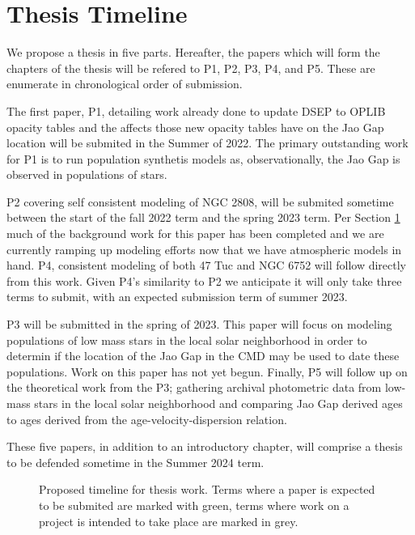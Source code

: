 \section{Thesis Timeline}
We propose a thesis in five parts. Hereafter, the papers which will form the
chapters of the thesis will be refered to P1, P2, P3, P4, and P5. These are
enumerate in chronological order of submission.

The first paper, P1, detailing work already done to update DSEP to OPLIB opacity
tables and the affects those new opacity tables have on the Jao Gap location
will be submited in the Summer of 2022. The primary outstanding work for P1 
is to run population synthetis models as, observationally, the Jao Gap is
observed in populations of stars.

P2 covering self consistent modeling of NGC 2808, will be submited sometime
between the start of the fall 2022 term and the spring 2023 term. Per Section
\ref{} much of the background work for this paper has been completed and we are
currently ramping up modeling efforts now that we have atmospheric models in
hand. P4, consistent modeling of both 47 Tuc and NGC 6752 will follow directly
from this work. Given P4's similarity to P2 we anticipate it will only take
three terms to submit, with an expected submission term of summer 2023.

P3 will be submitted in the spring of 2023. This paper will focus on modeling
populations of low mass stars in the local solar neighborhood in order to
determin if the location of the Jao Gap in the CMD may be used to date these
populations. Work on this paper has not yet begun. Finally, P5 will follow up
on the theoretical work from the P3; gathering archival photometric data from
low-mass stars in the local solar neighborhood and comparing Jao Gap derived
ages to ages derived from the age-velocity-dispersion relation.

These five papers, in addition to an introductory chapter, will comprise a thesis
to be defended sometime in the Summer 2024 term.

\begin{figure}
	\centering
	
	\caption{Proposed timeline for thesis work. Terms where a paper is expected
	to be submited are marked with green, terms where work on a project is intended
	to take place are marked in grey.}
	\label{fig:timeline}
\end{figure}
